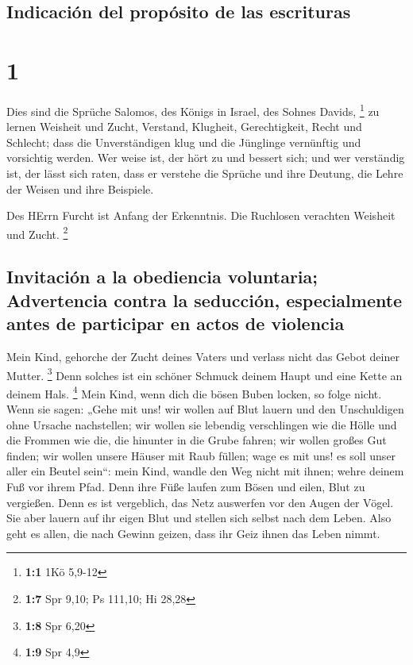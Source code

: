\hypertarget{indicaciuxf3n-del-propuxf3sito-de-las-escrituras}{%
\subsection{Indicación del propósito de las
escrituras}\label{indicaciuxf3n-del-propuxf3sito-de-las-escrituras}}

\hypertarget{section}{%
\section{1}\label{section}}

 Dies sind die Sprüche Salomos, des Königs in Israel, des
Sohnes Davids, \footnote{\textbf{1:1} 1Kö 5,9-12}  zu
lernen Weisheit und Zucht, Verstand,  Klugheit,
Gerechtigkeit, Recht und Schlecht;  dass die
Unverständigen klug und die Jünglinge vernünftig und vorsichtig werden.
 Wer weise ist, der hört zu und bessert sich; und wer
verständig ist, der lässt sich raten,  dass er verstehe
die Sprüche und ihre Deutung, die Lehre der Weisen und ihre Beispiele.

 Des HErrn Furcht ist Anfang der Erkenntnis. Die Ruchlosen
verachten Weisheit und Zucht. \footnote{\textbf{1:7} Spr 9,10; Ps
  111,10; Hi 28,28}

\hypertarget{invitaciuxf3n-a-la-obediencia-voluntaria-advertencia-contra-la-seducciuxf3n-especialmente-antes-de-participar-en-actos-de-violencia}{%
\subsection{Invitación a la obediencia voluntaria; Advertencia contra la
seducción, especialmente antes de participar en actos de
violencia}\label{invitaciuxf3n-a-la-obediencia-voluntaria-advertencia-contra-la-seducciuxf3n-especialmente-antes-de-participar-en-actos-de-violencia}}

 Mein Kind, gehorche der Zucht deines Vaters und verlass
nicht das Gebot deiner Mutter. \footnote{\textbf{1:8} Spr 6,20}
 Denn solches ist ein schöner Schmuck deinem Haupt und
eine Kette an deinem Hals. \footnote{\textbf{1:9} Spr 4,9}
 Mein Kind, wenn dich die bösen Buben locken, so folge
nicht.  Wenn sie sagen: „Gehe mit uns! wir wollen auf
Blut lauern und den Unschuldigen ohne Ursache nachstellen;
 wir wollen sie lebendig verschlingen wie die Hölle und
die Frommen wie die, die hinunter in die Grube fahren; 
wir wollen großes Gut finden; wir wollen unsere Häuser mit Raub füllen;
 wage es mit uns! es soll unser aller ein Beutel sein``:
 mein Kind, wandle den Weg nicht mit ihnen; wehre deinem
Fuß vor ihrem Pfad.  Denn ihre Füße laufen zum Bösen und
eilen, Blut zu vergießen.  Denn es ist vergeblich, das
Netz auswerfen vor den Augen der Vögel.  Sie aber lauern
auf ihr eigen Blut und stellen sich selbst nach dem Leben.
 Also geht es allen, die nach Gewinn geizen, dass ihr
Geiz ihnen das Leben nimmt.

